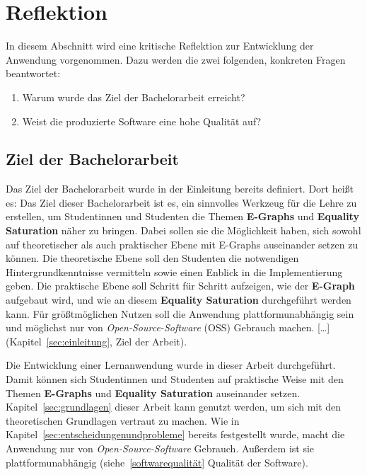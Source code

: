 \section{Reflektion}\label{sec:reflektion}

In diesem Abschnitt wird eine kritische Reflektion zur Entwicklung der Anwendung vorgenommen. Dazu werden die zwei folgenden, konkreten Fragen beantwortet:

\begin{enumerate}[nolistsep]
    \item Warum wurde das Ziel der Bachelorarbeit erreicht?
    \item Weist die produzierte Software eine hohe Qualität auf?
\end{enumerate}

\subsection{Ziel der Bachelorarbeit}

Das Ziel der Bachelorarbeit wurde in der Einleitung bereits definiert. Dort heißt es: 
\glqq Das Ziel dieser Bachelorarbeit ist es, ein sinnvolles Werkzeug für die Lehre zu erstellen,
um Studentinnen und Studenten die Themen \textbf{E-Graphs} und \textbf{Equality Saturation} näher zu bringen.
Dabei sollen sie die Möglichkeit haben, sich sowohl auf theoretischer als auch praktischer Ebene mit E-Graphs auseinander setzen zu können.
Die theoretische Ebene soll den Studenten die notwendigen Hintergrundkenntnisse vermitteln sowie einen Enblick in die Implementierung geben.
Die praktische Ebene soll Schritt für Schritt aufzeigen, wie der \textbf{E-Graph} aufgebaut wird, und wie an diesem \textbf{Equality Saturation} durchgeführt werden kann.
Für grö{\ss}tmöglichen Nutzen soll die Anwendung plattformunabhängig sein und möglichst nur von \textit{Open-Source-Software} (OSS) Gebrauch machen. [\ldots]\grqq 
(Kapitel~\ref{sec:einleitung}, Ziel der Arbeit).

Die Entwicklung einer Lernanwendung wurde in dieser Arbeit durchgeführt. Damit können sich Studentinnen und Studenten auf praktische Weise mit den Themen 
\textbf{E-Graphs} und \textbf{Equality Saturation} auseinander setzen. Kapitel~\ref{sec:grundlagen} dieser Arbeit kann genutzt werden, um sich mit den
theoretischen Grundlagen vertraut zu machen. 
Wie in Kapitel~\ref{sec:entscheidungenundprobleme} bereits festgestellt wurde, macht die Anwendung nur von \textit{Open-Source-Software} Gebrauch. Außerdem ist
sie plattformunabhängig (siehe~\ref{softwarequalität} Qualität der Software).




